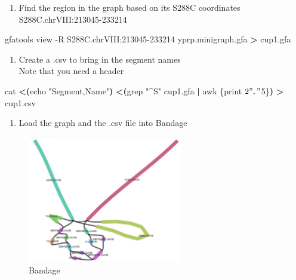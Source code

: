 \documentclass[
]{book}
\newenvironment{Shaded}{\begin{snugshade}}{\end{snugshade}}
\newcommand{\AttributeTok}[1]{\textcolor[rgb]{0.77,0.63,0.00}{#1}}
\newcommand{\BuiltInTok}[1]{#1}
\newcommand{\ExtensionTok}[1]{#1}
\newcommand{\FunctionTok}[1]{\textcolor[rgb]{0.00,0.00,0.00}{#1}}
\newcommand{\KeywordTok}[1]{\textcolor[rgb]{0.13,0.29,0.53}{\textbf{#1}}}
\newcommand{\NormalTok}[1]{#1}
\newcommand{\OperatorTok}[1]{\textcolor[rgb]{0.81,0.36,0.00}{\textbf{#1}}}
\newcommand{\StringTok}[1]{\textcolor[rgb]{0.31,0.60,0.02}{#1}}
\providecommand{\tightlist}{%
  \setlength{\itemsep}{0pt}\setlength{\parskip}{0pt}}
\begin{document}
\begin{enumerate}
\def\labelenumi{\arabic{enumi}.}
\tightlist
\item
  Find the region in the graph based on its S288C coordinates\\
  S288C.chrVIII:213045-233214
\end{enumerate}

\begin{Shaded}
\begin{Highlighting}[]
\ExtensionTok{gfatools}\NormalTok{ view }\AttributeTok{{-}R}\NormalTok{ S288C.chrVIII:213045{-}233214 yprp.minigraph.gfa }\OperatorTok{\textgreater{}}\NormalTok{ cup1.gfa}
\end{Highlighting}
\end{Shaded}

\begin{enumerate}
\def\labelenumi{\arabic{enumi}.}
\setcounter{enumi}{1}
\tightlist
\item
  Create a .csv to bring in the segment names\\
  Note that you need a header
\end{enumerate}

\begin{Shaded}
\begin{Highlighting}[]
 \FunctionTok{cat} \OperatorTok{\textless{}(}\BuiltInTok{echo} \StringTok{"Segment,Name"}\OperatorTok{)} \OperatorTok{\textless{}(}\FunctionTok{grep} \StringTok{"\^{}S"}\NormalTok{ cup1.gfa }\KeywordTok{|} \FunctionTok{awk} \StringTok{\textquotesingle{}\{print $2 "," $5\}\textquotesingle{}}\OperatorTok{)} \OperatorTok{\textgreater{}}\NormalTok{ cup1.csv}
\end{Highlighting}
\end{Shaded}

\begin{enumerate}
\def\labelenumi{\arabic{enumi}.}
\setcounter{enumi}{2}
\tightlist
\item
  Load the graph and the .csv file into Bandage
\end{enumerate}

\begin{figure}
\centering
\includegraphics[width=0.6\textwidth,height=\textheight]{./Figures/Bandage3.png}
\caption{Bandage}
\end{figure}
\end{document}
